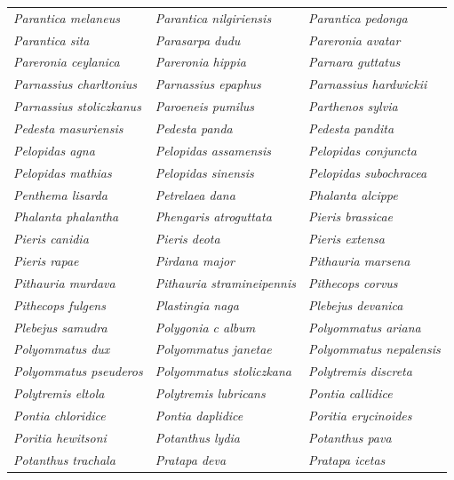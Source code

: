 \documentclass[runningheads]{llncs}
\begin{document}
\begin{longtable}{lll}
\textit{Parantica melaneus} & \textit{Parantica nilgiriensis} & \textit{Parantica pedonga} \\
\textit{Parantica sita} & \textit{Parasarpa dudu} & \textit{Pareronia avatar} \\
\textit{Pareronia ceylanica} & \textit{Pareronia hippia} & \textit{Parnara guttatus} \\
\textit{Parnassius charltonius} & \textit{Parnassius epaphus} & \textit{Parnassius hardwickii} \\
\textit{Parnassius stoliczkanus} & \textit{Paroeneis pumilus} & \textit{Parthenos sylvia} \\
\textit{Pedesta masuriensis} & \textit{Pedesta panda} & \textit{Pedesta pandita} \\
\textit{Pelopidas agna} & \textit{Pelopidas assamensis} & \textit{Pelopidas conjuncta} \\
\textit{Pelopidas mathias} & \textit{Pelopidas sinensis} & \textit{Pelopidas subochracea} \\
\textit{Penthema lisarda} & \textit{Petrelaea dana} & \textit{Phalanta alcippe} \\
\textit{Phalanta phalantha} & \textit{Phengaris atroguttata} & \textit{Pieris brassicae} \\
\textit{Pieris canidia} & \textit{Pieris deota} & \textit{Pieris extensa} \\
\textit{Pieris rapae} & \textit{Pirdana major} & \textit{Pithauria marsena} \\
\textit{Pithauria murdava} & \textit{Pithauria stramineipennis} & \textit{Pithecops corvus} \\
\textit{Pithecops fulgens} & \textit{Plastingia naga} & \textit{Plebejus devanica} \\
\textit{Plebejus samudra} & \textit{Polygonia c album} & \textit{Polyommatus ariana} \\
\textit{Polyommatus dux} & \textit{Polyommatus janetae} & \textit{Polyommatus nepalensis} \\
\textit{Polyommatus pseuderos} & \textit{Polyommatus stoliczkana} & \textit{Polytremis discreta} \\
\textit{Polytremis eltola} & \textit{Polytremis lubricans} & \textit{Pontia callidice} \\
\textit{Pontia chloridice} & \textit{Pontia daplidice} & \textit{Poritia erycinoides} \\
\textit{Poritia hewitsoni} & \textit{Potanthus lydia} & \textit{Potanthus pava} \\
\textit{Potanthus trachala} & \textit{Pratapa deva} & \textit{Pratapa icetas} \\

\end{longtable}
\end{document}

